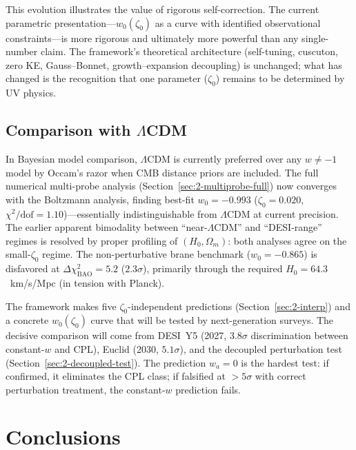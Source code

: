 This evolution illustrates the value of rigorous self-correction. The current parametric presentation---$w_0(\zeta_0)$ as a curve with identified observational constraints---is more rigorous and ultimately more powerful than any single-number claim. The framework's theoretical architecture (self-tuning, cuscuton, zero KE, Gauss--Bonnet, growth--expansion decoupling) is unchanged; what has changed is the recognition that one parameter ($\zeta_0$) remains to be determined by UV physics.

\subsection{Comparison with $\Lambda$CDM}
\label{sec:2-comparison}

In Bayesian model comparison, $\Lambda$CDM is currently preferred over any $w \neq -1$ model by Occam's razor when CMB distance priors are included. The full numerical multi-probe analysis (Section~\ref{sec:2-multiprobe-full}) now converges with the Boltzmann analysis, finding best-fit $w_0 = -0.993$ ($\zeta_0 = 0.020$, $\chi^2/\mathrm{dof} = 1.10$)---essentially indistinguishable from $\Lambda$CDM at current precision. The earlier apparent bimodality between ``near-$\Lambda$CDM'' and ``DESI-range'' regimes is resolved by proper profiling of $(H_0, \Omega_m)$: both analyses agree on the small-$\zeta_0$ regime. The non-perturbative brane benchmark ($w_0 = -0.865$) is disfavored at $\Delta\chi^2_\mathrm{BAO} = 5.2$ ($2.3\sigma$), primarily through the required $H_0 = 64.3$~km/s/Mpc (in tension with Planck).

The framework makes five $\zeta_0$-independent predictions (Section~\ref{sec:2-interp}) and a concrete $w_0(\zeta_0)$ curve that will be tested by next-generation surveys. The decisive comparison will come from DESI~Y5 (2027, $3.8\sigma$ discrimination between constant-$w$ and CPL), Euclid (2030, $5.1\sigma$), and the decoupled perturbation test (Section~\ref{sec:2-decoupled-test}). The prediction $w_a = 0$ is the hardest test: if confirmed, it eliminates the CPL class; if falsified at $> 5\sigma$ with correct perturbation treatment, the constant-$w$ prediction fails.

\section{Conclusions}
\label{sec:2-conclusions}

